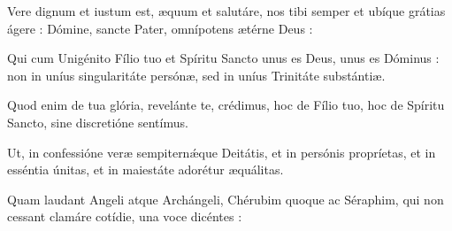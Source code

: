 Vere dignum et iustum est,
æ\-quum et salutáre,
nos tibi semper et ubíque grátias ágere :
Dómine, sancte Pater, omnípotens ætérne Deus :

Qui cum Unigénito Fílio tuo et Spíritu Sancto
unus es Deus, unus es Dóminus :
non in uníus singularitáte persónæ,
sed in uníus Trinitáte substántiæ.

Quod enim de tua glória,
revelánte te, crédimus,
hoc de Fílio tuo, hoc de Spíritu Sancto,
sine discretióne sentímus.

Ut, in confessióne veræ sempiternǽque Deitátis,
et in persónis propríetas,
et in esséntia únitas,
et in maiestáte adorétur æquálitas.

Quam laudant Angeli atque Archángeli,
Chérubim quoque ac Séraphim,
qui non cessant cla\-má\-re cotídie,
una voce dicéntes :
